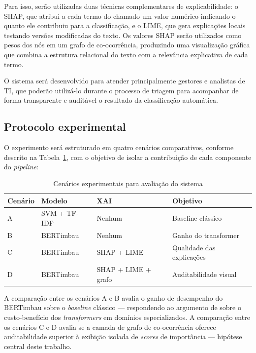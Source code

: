 \documentclass[
    12pt,                %
    openright,           %
    oneside,             %
    a4paper,             %
    english,             %
    brazil               %
]{abntex2}
\begin{document}
Para isso, serão utilizadas duas técnicas complementares de 
explicabilidade: o SHAP, que atribui a cada termo do chamado um 
valor numérico indicando o quanto ele contribuiu para a 
classificação, e o LIME, que gera explicações locais testando 
versões modificadas do texto. Os valores SHAP serão utilizados 
como pesos dos nós em um grafo de co-ocorrência, produzindo uma 
visualização gráfica que combina a estrutura relacional do 
texto com a relevância explicativa de cada termo.

O sistema será desenvolvido para atender principalmente gestores 
e analistas de TI, que poderão utilizá-lo durante o processo de 
triagem para acompanhar de forma transparente e auditável o 
resultado da classificação automática.

\subsection{Protocolo experimental}
\label{subsec:experimentos}

O experimento será estruturado em quatro cenários comparativos, conforme descrito na Tabela~\ref{tab:cenarios}, com o objetivo de isolar a contribuição de cada componente do \textit{pipeline}:

\begin{table}[H]
\centering
\caption{Cenários experimentais para avaliação do sistema}
\label{tab:cenarios}
\begin{tabular}{p{1.5cm} p{3.5cm} p{3.5cm} p{4.5cm}}
\toprule
\textbf{Cenário} & \textbf{Modelo} & \textbf{XAI} & \textbf{Objetivo} \\
\midrule
A & SVM + TF-IDF & Nenhum & Baseline clássico \\
B & BERTimbau & Nenhum & Ganho do transformer \\
C & BERTimbau & SHAP + LIME & Qualidade das explicações \\
D & BERTimbau & SHAP + LIME + grafo & Auditabilidade visual \\
\bottomrule
\end{tabular}
\end{table}

A comparação entre os cenários A e B avalia o ganho de desempenho do BERTimbau sobre o \textit{baseline} clássico — respondendo ao argumento de  sobre o custo-benefício dos \textit{transformers} em domínios especializados. A comparação entre os cenários C e D avalia se a camada de grafo de co-ocorrência oferece auditabilidade superior à exibição isolada de \textit{scores} de importância — hipótese central deste trabalho.
\end{document}
